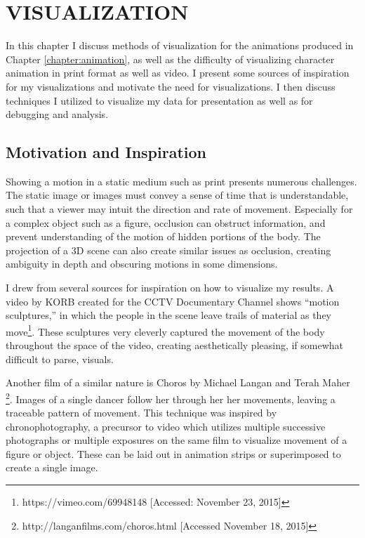 
 
\chapter{VISUALIZATION}
\label{chapter:visualization}
In this chapter I discuss methods of visualization for the animations produced in Chapter \ref{chapter:animation}, as well as the difficulty of visualizing character animation in print format as well as video.  I present some sources of inspiration for my visualizations and motivate the need for visualizations.  I then discuss techniques I utilized to visualize my data for presentation as well as for debugging and analysis.

\section{Motivation and Inspiration}
\label{section:vis_insp}
Showing a motion in a static medium such as print presents numerous challenges.  The static image or images must convey a sense of time that is understandable, such that a viewer may intuit the direction and rate of movement.  Especially for a complex object such as a figure, occlusion can obstruct information, and prevent understanding of the motion of hidden portions of the body.  The projection of a 3D scene can also create similar issues as occlusion, creating ambiguity in depth and obscuring motions in some dimensions.

I drew from several sources for inspiration on how to visualize my results.  A video by KORB created for the CCTV Documentary Channel shows ``motion sculptures,'' in which the people in the scene leave trails of material as they move\footnote{https://vimeo.com/69948148 [Accessed: November 23, 2015]}.  These sculptures very cleverly captured the movement of the body throughout the space of the video, creating aesthetically pleasing, if somewhat difficult to parse, visuals.

Another film of a similar nature is Choros by Michael Langan and Terah Maher \footnote{http://langanfilms.com/choros.html [Accessed November 18, 2015]}.  Images of a single dancer follow her through her her movements, leaving a traceable pattern of movement.  This technique was inspired by chronophotography, a precursor to video which utilizes multiple successive photographs or multiple exposures on the same film to visualize movement of a figure or object.  These can be laid out in animation strips or superimposed to create a single image.

